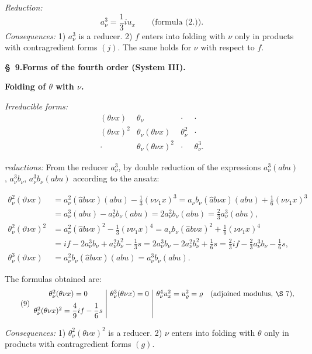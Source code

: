 \documentclass[11pt]{article}
\begin{document}
\noindent\emph{Reduction:}
\[
a_\nu^3=\frac13 i u_x\qquad\text{(formula (2.)).}
\]
\noindent\emph{Consequences:} 1) $a_\nu^3$ is a reducer. 2) $f$ enters into folding with $\nu$ only in products with contragredient forms $(j)$. The same holds for $\nu$ with respect to $f$.

\begin{center}
\textbf{\S\ 9.\quad Forms of the fourth order (System III).}
\end{center}

\noindent\textbf{Folding of $\theta$ with $\nu$.}

\noindent\emph{Irreducible forms:}
\[
\begin{array}{cccc}
(\theta\nu x)&\theta_\nu&\cdot&\cdot\\
(\theta\nu x)^2&\theta_\nu(\theta\nu x)&\theta_\nu^2&\cdot\\
\cdot&\theta_\nu(\theta\nu x)^2&\cdot&\theta_\nu^3.
\end{array}
\]

\noindent\emph{reductions:} From the reducer $a_\nu^3$, by double reduction of the expressions $a_\nu^3(abu)$, $a_\nu^3b_\nu$, $a_\nu^3b_\nu(abu)$ according to the ansatz:


\[
\begin{aligned}
\theta_\nu^2(\vartheta\nu x)
&=a_\nu^2(\widehat{a}b\nu x)(abu)-\frac13(\nu\nu_1x)^3=a_\nu b_\nu(\widehat{a}b\nu x)(abu)+\frac16(\nu\nu_1x)^3\\
&=a_\nu^3(abu)-a_\nu^2b_\nu(abu)=2a_\nu^2b_\nu(abu)=\frac23a_\nu^3(abu),\\[.4em]
\theta_\nu^2(\vartheta\nu x)^2
&=a_\nu^2(\widehat{a}b\nu x)^2-\frac13(\nu\nu_1x)^4=a_\nu b_\nu(\widehat{a}b\nu x)^2+\frac16(\nu\nu_1x)^4\\
&=if-2a_\nu^3b_\nu+a_\nu^2b_\nu^2-\frac13s=2a_\nu^3b_\nu-2a_\nu^2b_\nu^2+\frac16s=\frac23if-\frac23a_\nu^3b_\nu-\frac16s,\\[.4em]
\theta_\nu^3(\vartheta\nu x)&=a_\nu^2b_\nu(\widehat{a}b\nu x)(abu)=a_\nu^3b_\nu(abu).
\end{aligned}
\]


The formulas obtained are:
\[
\tag{9}
\begin{array}{c|c|c}
\theta_\nu^2(\theta\nu x)=0
& \theta_\nu^3(\theta\nu x)=0
& \theta_\nu^4u_x^2=u_\varrho^2=\varrho\quad(\text{adjoined modulus, \S\ 7}),\\[0.6em]
\theta_\nu^2(\theta\nu x)^2=\dfrac49 i f-\dfrac16s
& &
\end{array}
\]

\noindent\emph{Consequences:} 1) $\theta_\nu^2(\theta\nu x)^2$ is a reducer. 2) $\nu$ enters into folding with $\theta$ only in products with contragredient forms $(g)$.
\end{document}
